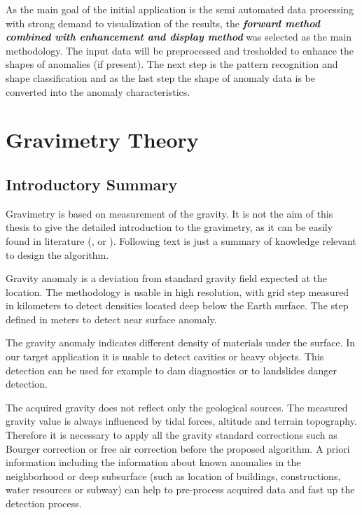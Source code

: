 \documentclass[FM]{tulthesis}
\begin{document}
As the main goal of the initial application is the semi automated data processing with strong demand to visualization of the results, the \textbf{\emph{forward method combined with enhancement and display method}} was selected as the main methodology. The input data will be preprocessed and tresholded to enhance the shapes of anomalies (if present). The next step is the pattern recognition and shape classification and as the last step the shape of anomaly data is be converted into the anomaly characteristics. 

\section{Gravimetry Theory} \label{sec:GravimetryTheory}

\subsection{Introductory Summary} \label{sec:GraviSummary}
Gravimetry is based on measurement of the gravity. It is not the aim of this thesis to give the detailed introduction to the gravimetry, as it can be easily found in literature (\cite{Mares}, \cite{Blakely} or \cite{Reynolds}). Following text is just a summary of knowledge relevant to design the algorithm. 

Gravity anomaly is a deviation from standard gravity field expected at the location. The methodology is usable in high resolution, with grid step measured in kilometers to detect densities located deep below the Earth surface. The step defined in meters to detect near surface anomaly. 

The gravity anomaly indicates different density of materials under the surface. In our target application it is usable to detect cavities or heavy objects. This detection can be used for example to dam diagnostics or to landslides danger detection. 

The acquired gravity does not reflect only the geological sources. The measured gravity value is always influenced by tidal forces, altitude and terrain topography. Therefore it is necessary to apply all the gravity standard corrections such as Bourger correction or free air correction before the proposed algorithm. A priori information including the information about known anomalies in the neighborhood or deep subsurface (such as location of buildings, constructions, water resources or subway) can help to pre-process acquired data and fast up the detection process.
\end{document}
